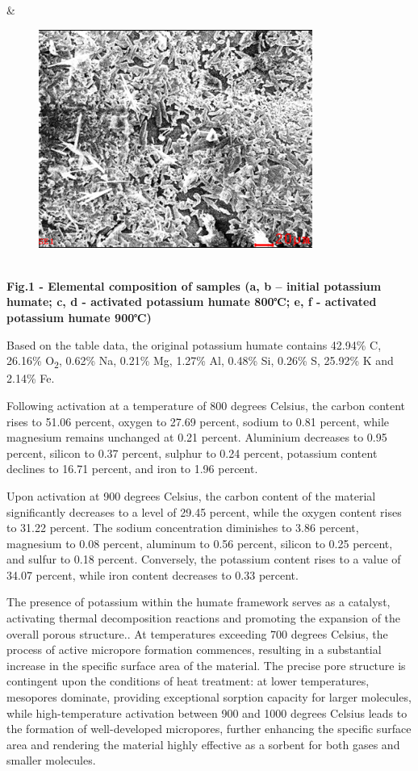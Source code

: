  &
\begin{figure}[H]
	\centering
	\includegraphics[width=0.8\textwidth]{media/chem2/image92}
	\caption*{}
\end{figure}
 \\

{\bfseries Fig.1 - Elemental composition of samples (a, b -- initial
potassium humate; c, d - activated potassium humate 800℃; e, f -
activated potassium humate 900℃)}

Based on the table data, the original potassium humate contains 42.94\%
C, 26.16\% O\textsubscript{2}, 0.62\% Na, 0.21\% Mg, 1.27\% Al, 0.48\%
Si, 0.26\% S, 25.92\% K and 2.14\% Fe.

Following activation at a temperature of 800 degrees Celsius, the carbon
content rises to 51.06 percent, oxygen to 27.69 percent, sodium to 0.81
percent, while magnesium remains unchanged at 0.21 percent. Aluminium
decreases to 0.95 percent, silicon to 0.37 percent, sulphur to 0.24
percent, potassium content declines to 16.71 percent, and iron to 1.96
percent.

Upon activation at 900 degrees Celsius, the carbon content of the
material significantly decreases to a level of 29.45 percent, while the
oxygen content rises to 31.22 percent. The sodium concentration
diminishes to 3.86 percent, magnesium to 0.08 percent, aluminum to 0.56
percent, silicon to 0.25 percent, and sulfur to 0.18 percent.
Conversely, the potassium content rises to a value of 34.07 percent,
while iron content decreases to 0.33 percent.

The presence of potassium within the humate framework serves as a
catalyst, activating thermal decomposition reactions and promoting the
expansion of the overall porous structure.. At temperatures exceeding
700 degrees Celsius, the process of active micropore formation
commences, resulting in a substantial increase in the specific surface
area of the material. The precise pore structure is contingent upon the
conditions of heat treatment: at lower temperatures, mesopores dominate,
providing exceptional sorption capacity for larger molecules, while
high-temperature activation between 900 and 1000 degrees Celsius leads
to the formation of well-developed micropores, further enhancing the
specific surface area and rendering the material highly effective as a
sorbent for both gases and smaller molecules.

